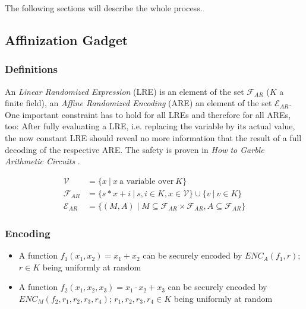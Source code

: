 \documentclass[12pt, a4paper]{article}
\begin{document}
The following sections will describe the whole process.


\subsection{Affinization Gadget}
\label{sec:affinization-gadget}

\subsubsection{Definitions}
\label{sec:affinization_definitions}

An \emph{Linear Randomized Expression} (LRE) is an element of the set
$\mathcal{F}_{AR}$ ($K$ a finite field), an \emph{Affine Randomized Encoding}
(ARE) an element of the set $\mathcal{E}_{AR}$. One important constraint has to
hold for all LREs and therefore for all AREs, too: After fully evaluating a LRE,
i.e. replacing the variable by its actual value, the now constant LRE should
reveal no more information that the result of a full decoding of the respective
ARE. The safety is proven in \emph{How to Garble Arithmetic Circuits}
\cite{gac2012}.

\begin{align}
\mathcal{V} & = \{ x\ |\ x\ \text{a variable over}\ K \} \\
\mathcal{F}_{AR} & = \{ s * x + i\ |\ s, i \in K, x \in \mathcal{V} \} \cup
\{ v\ |\ v \in K \} \\
\mathcal{E}_{AR} & = \{ (M, A) \mid M \subseteq \mathcal{F}_{AR} \times
\mathcal{F}_{AR}, A \subseteq \mathcal{F}_{AR} \}
\end{align}


\subsubsection{Encoding}
\label{sec:affinization_encoding}

\begin{itemize}

\item A function $f_1(x_1, x_2) = x_1 + x_2$ can be securely encoded by
$ENC_A(f_1, r)$; $r \in K$ being uniformly at random

\item A function $f_2(x_1, x_2, x_3) = x_1 \cdot x_2 + x_3$ can be securely
encoded by $ENC_M(f_2, r_1, r_2, r_3, r_4)$; $r_1, r_2, r_3, r_4 \in K$ being
uniformly at random
\end{itemize}
\end{document}

